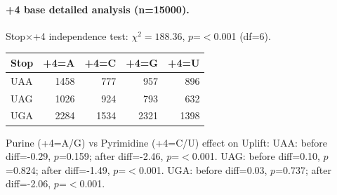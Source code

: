 \paragraph{+4 base detailed analysis (n=15000).}
Stop$\times$+4 independence test: $\chi^2=188.36$, $p$=$<$0.001 (df=6).
\begin{center}\small
\begin{tabular}{lrrrr}\toprule
Stop & +4=A & +4=C & +4=G & +4=U \\\midrule
UAA & 1458 & 777 & 957 & 896 \\
UAG & 1026 & 924 & 793 & 632 \\
UGA & 2284 & 1534 & 2321 & 1398 \\
\bottomrule\end{tabular}\end{center}
Purine (+4=A/G) vs Pyrimidine (+4=C/U) effect on Uplift:
  UAA: before diff=-0.29, $p$=0.159; after diff=-2.46, $p$=$<$0.001.
  UAG: before diff=0.10, $p$=0.824; after diff=-1.49, $p$=$<$0.001.
  UGA: before diff=0.03, $p$=0.737; after diff=-2.06, $p$=$<$0.001.
